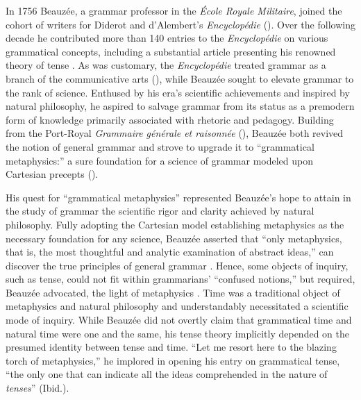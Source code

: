 \documentclass[output=paper]{langsci/langscibook}
\begin{document}
 In 1756 Beauzée, a grammar professor in the \textit{École Royale Militaire}, joined the cohort of writers for Diderot and d’Alembert’s \textit{Encyclopédie} (\citealt{le_guern_nicolas_2009}). Over the following decade he contributed more than 140 entries to the \textit{Encyclopédie} on various grammatical concepts, including a substantial article presenting his renowned theory of tense \citep{beauzee_tems_1765}. As was customary, the \textit{Encyclopédie} treated grammar as a branch of the communicative arts (\citealt{dalembert_systeme_1751}), while Beauzée sought to elevate grammar to the rank of science. Enthused by his era’s scientific achievements and inspired by natural philosophy, he aspired to salvage grammar from its status as a premodern form of knowledge primarily associated with rhetoric and pedagogy. Building from the Port\nobreakdash-Royal \textit{Grammaire générale et raisonnée} (\citealt{arnauld_grammaire_1660}), Beauzée both revived the notion of general grammar and strove to upgrade it to “grammatical metaphysics:” a sure foundation for a science of grammar modeled upon Cartesian precepts (\citealt{chalozin-dovrat_grammar_2019}).
 
 His quest for “grammatical metaphysics” represented Beauzée’s hope to attain in the study of grammar the scientific rigor and clarity achieved by natural philosophy. Fully adopting the Cartesian model establishing metaphysics as the necessary foundation for any science, Beauzée asserted that “only metaphysics, that is, the most thoughtful and analytic examination of abstract ideas,” can discover the true principles of general grammar \citep[vol.1: xxxiij–xxxv]{beauzee_grammaire_1767}. Hence, some objects of inquiry, such as tense, could not fit within grammarians’ “confused notions,” but required, Beauzée advocated, the light of metaphysics \citep[96]{beauzee_grammaire_1767}. Time was a traditional object of metaphysics and natural philosophy and understandably necessitated a scientific mode of inquiry. While Beauzée did not overtly claim that grammatical time and natural time were one and the same, his tense theory implicitly depended on the presumed identity between tense and time. “Let me resort here to the blazing torch of metaphysics,” he implored in opening his entry on grammatical tense, “the only one that can indicate all the ideas comprehended in the nature of \textit{tenses}” (Ibid.).
 
\end{document}
